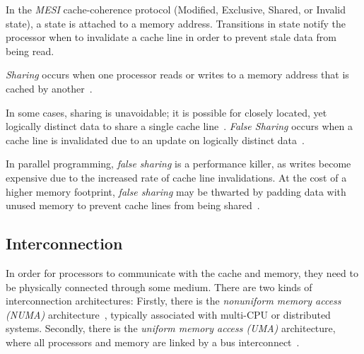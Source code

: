 
In the \emph{MESI} cache-coherence protocol (Modified, Exclusive, Shared,
or Invalid state), a state is attached to a memory address. Transitions in
state notify the processor when to invalidate a cache line in order to prevent
stale data from being read.

\emph{Sharing} occurs when one processor reads or writes to a memory address that
is cached by another~\cite[Appendix~B.5.1]{herlihy2020art}.


In some cases, sharing is unavoidable; it is possible for closely located, yet
logically distinct data to share a single cache line~\cite[Appendix~B.5.1]{herlihy2020art}. \emph{False Sharing} occurs when
a cache line is invalidated due to an update on logically distinct data~\cite[Appendix~B.5.1]{herlihy2020art}. 

In parallel programming, \emph{false sharing} is a
performance killer, as writes become expensive due to the increased rate of
cache line invalidations. At the cost of a higher memory footprint, \emph{false
sharing} may be thwarted by padding data with unused memory to prevent cache
lines from being shared~\cite{scott2013shared}.

\subsection{Interconnection}
In order for processors to communicate with the cache and memory, they need to
be physically connected through some medium. There are two kinds of
interconnection architectures: Firstly, there is the \emph{nonuniform memory
access (NUMA)} architecture~\cite[Appendix~B.3]{herlihy2020art}, typically associated with multi-CPU or distributed
systems. Secondly, there is the \emph{uniform memory access (UMA)} architecture,
where all processors and memory are linked by a bus
interconnect~\cite[Appendix~B.3]{herlihy2020art}.

